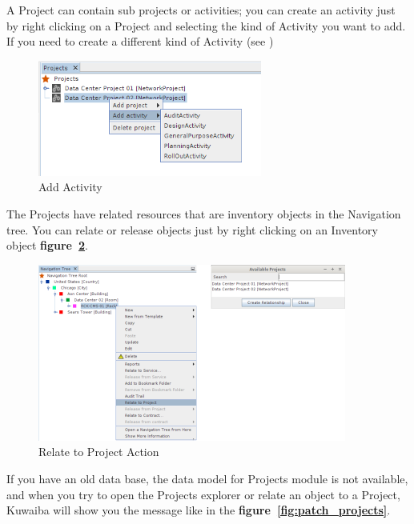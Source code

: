 \documentclass[a4paper]{article}
\begin{document}
		    A Project can contain sub projects or activities; you can create an activity just by right clicking on a Project and selecting the kind of Activity you want to add. If you need to create a different kind of Activity (see \textbf{})
		    \newline
		    
		    \begin{figure}[h!]
		    	\centering
		    	\includegraphics[width=0.5\linewidth]{img/activity_actions.png}
		    	\caption{Add Activity}
		    	\label{fig:activity_actions}
		    \end{figure}
		    
		    The Projects have related resources that are inventory objects in the Navigation tree. You can relate or release objects just by right clicking on an Inventory object \textbf{figure~\ref{fig:pm_relate_to_project}}.
		    \newline
		    		    
		    \begin{figure}[h!]
		    	\centering
		    	\includegraphics[width=0.9\linewidth]{img/pm_relate_to_project.png}
		    	\caption{Relate to Project Action}
		    	\label{fig:pm_relate_to_project}
		    \end{figure}
		    
		    If you have an old data base, the data model for Projects module is not available, and when you try to open the Projects explorer or relate an object to a Project,
		    Kuwaiba will show you the message like in the \textbf{figure~\ref{fig:patch_projects}}.
		    \newline
		    
\end{document}
